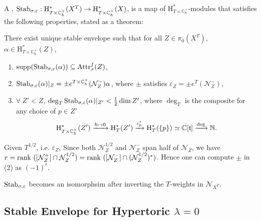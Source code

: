 \documentclass[b5paper]{article}
\newcommand{\mathintitle}[1]{\texorpdfstring{$#1$}{\detokenize{#1}}}
\newcommand{\NN}{\mathcal{N}}
\newcommand{\HH}{\mathrm{H}}
\newcommand{\supp}{\mathrm{supp}}
\newcommand{\Stab}{\textnormal{Stab}_{\sigma,\varepsilon}}
\newcommand{\fAttr}{\textnormal{Attr}^f_\sigma}
\newcommand{\Chbar}{\mathbb{C}^\times _\hbar}
\begin{document}
A , $\Stab:\HH^*_{T\times \Chbar}(X^T)\rightarrow \HH^*_{T\times \Chbar}(X)$, is a map of $\HH^*_{T\times \Chbar}$-modules that satisfies the following properties, stated as a theorem:

\begin{theorem}{\cite{maulik2012quantum}}
    There exist unique stable envelope such that for all $Z\in \pi_0(X^T)$, $\alpha\in \HH^*_{T\times \Chbar}(Z)$,
    \begin{enumerate}
        \item $\supp(\Stab(\alpha))\subseteq \fAttr(Z)$,
        \item $\Stab(\alpha)|_Z=\pm e^{T\times \Chbar}(\NN_Z^-)\alpha$, where $\pm$ satisfies $\varepsilon_Z=\pm e^T(\NN_Z^-)$,
        \item $\forall\ Z'<Z$, $\deg_T\Stab(\alpha)|_{Z'}<\frac{1}{2}\dim Z'$, where $\deg_T$ is the composite for any choice of $p\in Z'$
            \[
                \HH^*_{T\times \Chbar}(Z')\xrightarrow[]{\hbar\mapsto 0}\HH^*_T(Z')\xrightarrow[]{\iota^*_p}\HH^*_T(\CB{p})\simeq \mathbb{C}[\mathfrak{t}]\xrightarrow[]{\deg}\mathbb{N}.
            \]
    \end{enumerate}
    \begin{remark}
    Given $T^{1/2}$, i.e. $\varepsilon_Z$, Since both $\NN_Z^{1/2}$ and $\NN_Z^-$ span half of $\NN_Z$, we have $r=\rank([\NN_Z^+]\cap \NN_Z^{1/2})=\rank([\NN_Z^-]\cap (\NN_Z^{1/2})^*)$. Hence one can compute $\pm$ in (2) as $(-1)^r$.
    \end{remark}
\end{theorem}

\begin{theorem}[thm:]{}
    $\Stab$ becomes an isomorphsim after inverting the $T$-weights in $\NN_{X^T}$.
\end{theorem}

\subsection{Stable Envelope for Hypertoric \mathintitle{\lambda=0}}
\end{document}
